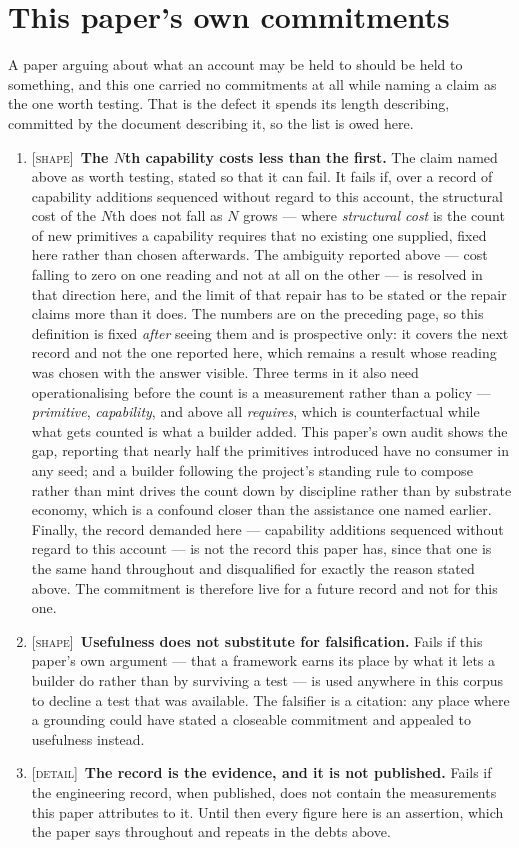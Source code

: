 \documentclass[11pt,a4paper]{article}
\theoremstyle{remark}\newtheorem{remark}[definition]{Remark}
\begin{document}
\section{This paper's own commitments}\label{sec:own-commitments}
A paper arguing about what an account may be held to should be held to something, and this one carried
no commitments at all while naming a claim as the one worth testing. That is the defect it spends its
length describing, committed by the document describing it, so the list is owed here.

\begin{enumerate}[leftmargin=*]
\item \textsc{[shape]}~\textbf{The $N$th capability costs less than the first.} The claim named above
as worth testing, stated so that it can fail. It fails if, over a record of capability additions
sequenced without regard to this account, the structural cost of the $N$th does not fall as $N$ grows
--- where \emph{structural cost} is the count of new primitives a capability requires that no existing
one supplied, fixed here rather than chosen afterwards. The ambiguity reported above --- cost falling to zero on
one reading and not at all on the other --- is resolved in that direction here, and the limit of that
repair has to be stated or the repair claims more than it does. The numbers are on the preceding page,
so this definition is fixed \emph{after} seeing them and is prospective only: it covers the next
record and not the one reported here, which remains a result whose reading was chosen with the answer
visible. Three terms in it also need operationalising before the count is a measurement rather than a
policy --- \emph{primitive}, \emph{capability}, and above all \emph{requires}, which is counterfactual
while what gets counted is what a builder added. This paper's own audit shows the gap, reporting that
nearly half the primitives introduced have no consumer in any seed; and a builder following the
project's standing rule to compose rather than mint drives the count down by discipline rather than by
substrate economy, which is a confound closer than the assistance one named earlier. Finally, the
record demanded here --- capability additions sequenced without regard to this account --- is not the
record this paper has, since that one is the same hand throughout and disqualified for exactly the
reason stated above. The commitment is therefore live for a future record and not for this one.
\item \textsc{[shape]}~\textbf{Usefulness does not substitute for falsification.} Fails if this
paper's own argument --- that a framework earns its place by what it lets a builder do rather than by
surviving a test --- is used anywhere in this corpus to decline a test that was available. The
falsifier is a citation: any place where a grounding could have stated a closeable commitment and
appealed to usefulness instead.
\item \textsc{[detail]}~\textbf{The record is the evidence, and it is not published.} Fails if the
engineering record, when published, does not contain the measurements this paper attributes to it. Until
then every figure here is an assertion, which the paper says throughout and repeats in the debts above.
\end{enumerate}
\end{document}
